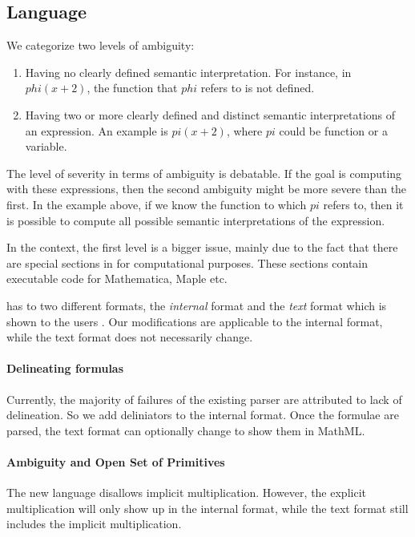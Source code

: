 \subsection{Language}
We categorize two levels of ambiguity:

\begin{enumerate}
    \item Having no clearly defined semantic interpretation. For instance, in $phi(x+2)$, the  function that $phi$
    refers to is not defined.

    \item Having two or more clearly defined and distinct semantic interpretations of an expression. An example is
    $pi(x+2)$, where $pi$ could be function or a variable.
\end{enumerate}

The level of severity in terms of ambiguity is debatable. If the goal is computing with these expressions, then the
second ambiguity might be more severe than the first. In the example above, if we know the function to which $pi$
refers to, then it is possible to compute all possible semantic interpretations of the expression.

In the \oeis context, the first level is a bigger issue, mainly due to the fact that there are special sections in
\oeis for computational purposes. These sections contain executable code for Mathematica, Maple etc.

\oeis has to two different formats, the \emph{internal} format and the \emph{text} format which is shown to the users
. Our modifications are applicable to the internal format, while the text format does not necessarily change.

\paragraph{Delineating formulas} Currently, the majority of failures of the existing parser are attributed to lack of
 delineation.
So we add deliniators to the internal format. Once the formulae are parsed, the text format can optionally change to
show them in MathML.

\paragraph{Ambiguity and Open Set of Primitives} The new language disallows implicit multiplication. However, the
explicit multiplication will only show up in the internal format, while the text format still includes the implicit
multiplication.

